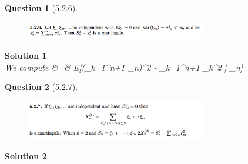 \documentclass[11pt]{article}
\theoremstyle{plain}
\def\eQb#1\eQe{\begin{eqnarray*}#1\end{eqnarray*}}
\theoremstyle{quest}
\newtheorem*{question}{Question}
\newtheorem*{solution}{Solution}
\begin{document}
\newpage

\begin{question}[5.2.6]
\hfill
\begin{figure}[h!]
  \centering
    \includegraphics[width=0.7\textwidth]{d-5-2-6.png}
\end{figure}
\end{question}
\begin{solution} \hfill \\
We compute
\eQb
E[S_{n+1}^2 - s_{n+1}^2 | \mathscr{F}_n] &=& 
E[(\sum_{k=1}^{n+1} \xi_n)^2 - \sum_{k=1}^{n+1} \sigma_k^2 | _n] \\ 
\eQe
\end{solution}

\newpage

\begin{question}[5.2.7]
\hfill
\begin{figure}[h!]
  \centering
    \includegraphics[width=0.7\textwidth]{d-5-2-7.png}
\end{figure}
\end{question}
\begin{solution} \hfill \\
\end{solution}
\end{document}
